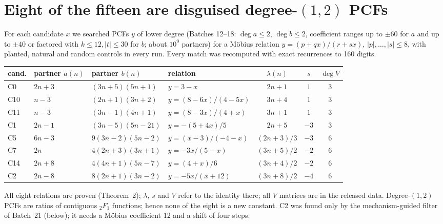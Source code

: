 \documentclass[11pt]{article}
\begin{document}
\section{Eight of the fifteen are disguised \texorpdfstring{degree-$(1,2)$}{degree-(1,2)} PCFs}
For each candidate $x$ we searched PCFs $y$ of lower degree (Batches 12--18: $\deg a\le2$, $\deg b\le2$, coefficient ranges up to
$\pm60$ for $a$ and up to $\pm40$ or factored with $k\le12,|t|\le30$ for $b$; about $10^9$ partners) for a M\"obius relation
$y=(p+qx)/(r+sx)$, $|p|,\dots,|s|\le8$, with planted, natural and random controls in every run. Every match was recomputed with
exact recurrences to 160 digits.
\begin{center}{\small\begin{tabular}{llllccc}\toprule
cand. & partner $a(n)$ & partner $b(n)$ & relation & $\lambda(n)$ & $s$ & $\deg V$\\\midrule
C0 & $2n+3$ & $(3n+5)(5n+1)$ & $y=3-x$ & $2n+1$ & $1$ & 3\\
C10 & $n-3$ & $(2n+1)(3n+2)$ & $y=(8-6x)/(4-5x)$ & $3n+4$ & $1$ & 3\\
C11 & $n-3$ & $(3n-1)(4n+1)$ & $y=(8-3x)/(4+x)$ & $3n+1$ & $1$ & 3\\
C1 & $2n-1$ & $(3n-5)(5n-21)$ & $y=-(5+4x)/5$ & $2n+5$ & $-3$ & 3\\
C5 & $6n-3$ & $9(3n-2)(5n-2)$ & $y=(x-3)/(-4-x)$ & $(2n+3)/3$ & $-3$ & 6\\
C7 & $2n$ & $4(2n+3)(3n+1)$ & $y=-3x/(5-x)$ & $(3n+5)/2$ & $-2$ & 6\\
C14 & $2n+8$ & $4(4n+1)(5n-7)$ & $y=(4+x)/6$ & $(3n+4)/2$ & $-2$ & 6\\
C2 & $2n-8$ & $8(2n+1)(3n-2)$ & $y=-5x/(x+12)$ & $(3n+8)/2$ & $-4$ & 6\\\bottomrule
\end{tabular}}\end{center}
All eight relations are proven (Theorem~2); $\lambda$, $s$ and $V$ refer to the identity there; all $V$ matrices are in the released data.
Degree-$(1,2)$ PCFs are ratios of contiguous ${}_2F_1$ functions; hence none of the eight is a new constant. C2 was found
only by the mechanism-guided filter of Batch~21 (below); it needs a M\"obius coefficient 12 and a shift of four steps.
\end{document}
